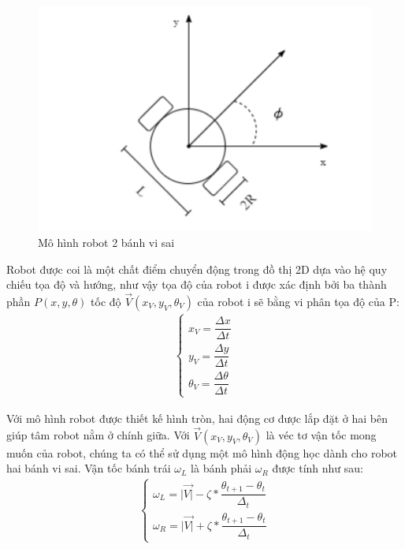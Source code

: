 \begin{figure}[H]
    \centering
    \includegraphics[scale=0.8]{chapter2/image/2banh.png}
    \caption{Mô hình robot 2 bánh vi sai}
    \label{fig:L298}
\end{figure}
Robot được coi là một chất điểm chuyển động trong đồ thị 2D dựa vào hệ quy
chiếu tọa độ và hướng, như vậy tọa độ của robot i được xác định bởi ba thành phần
$P(x,y,\theta)$ tốc độ $\overrightarrow{V}(x_{V},y_{V},\theta_{V})$ của robot i sẽ bằng vi phân tọa độ của P:
\begin{equation}
    \begin{aligned}
    \left\{ \begin{array}{c}
    x_{V}=\dfrac{\Delta x}{\Delta t}\\[1.5ex]
    y_{V}=\dfrac{\Delta y}{\Delta t}\\[1.5ex]
    \theta_{V}=\dfrac{\Delta\theta}{\Delta t}
    \end{array}\right.
    \end{aligned}
    \label{eqn:xytheta}
\end{equation}

Với mô hình robot được thiết kế hình tròn, hai động cơ được lắp đặt ở hai bên
giúp tâm robot nằm ở chính giữa. Với $\overrightarrow{V}(x_{V},y_{V},\theta_{V})$ là véc tơ vận tốc mong muốn của robot, chúng ta có thể sử dụng một mô hình động học dành cho robot hai bánh vi sai.
Vận tốc bánh trái $\omega_{L}$ là bánh phải $\omega_{R}$ được tính như sau:
\begin{equation}
    \begin{aligned}
        \left\{ \begin{array}{c}
        \omega_{L}=|\overrightarrow{V|}-\zeta*\dfrac{\theta_{t+1}-\theta_{t}}{\Delta_{t}}\\
        \omega_{R}=|\overrightarrow{V|}+\zeta*\dfrac{\theta_{t+1}-\theta_{t}}{\Delta_{t}}
        \end{array}\right.
    \end{aligned}
    \label{eqn:wlwr}
\end{equation}

